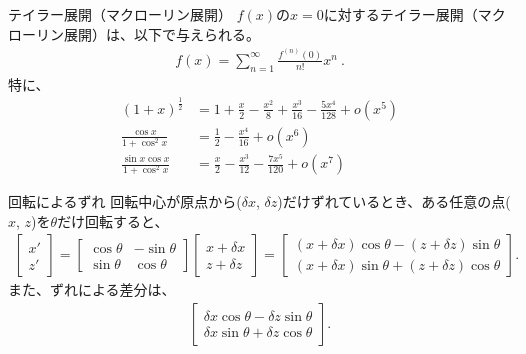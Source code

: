 


\begin{Formula}[label=formula:taylorexpansion]{テイラー展開（マクローリン展開）}
$f(x)$の$x = 0$に対するテイラー展開（マクローリン展開）は、以下で与えられる。
\begin{align*}
  f(x) = \sum_{n=1}^{\infty}\frac{f^{(n)}(0)}{n!}x^n\ .
\end{align*}
特に、
\begin{align*}
  (1+x)^\frac12 &= 1+\frac x2-\frac{x^2}8+\frac{x^3}{16}-\frac{5x^4}{128}+o\!\left(x^5\right)\\
  \frac{\cos x}{1+\cos^2x} &= \frac12-\frac{x^4}{16}+o\!\left(x^6\right)\\
  \frac{\sin x\cos x}{1+\cos^2x} &= \frac x2-\frac{x^3}{12}-\frac{7x^5}{120}+o\!\left(x^7\right)
\end{align*}
\end{Formula}



\begin{Formula}{回転によるずれ}
回転中心が原点から($\delta x$, $\delta z$)だけずれているとき、ある任意の点($x$, $z$)を$\theta$だけ回転すると、
\begin{align*}
  \left[
    \begin{array}{c}
      x'\\
      z'
    \end{array}
  \right]
  = \left[
    \begin{array}{cc}
      \cos\theta & -\sin\theta\\
      \sin\theta & \cos\theta
    \end{array}
  \right]\!\!
  \left[
    \begin{array}{c}
      x+\delta x\\
      z+\delta z
    \end{array}
  \right]
  = \left[
    \begin{array}{c}
      (x+\delta x)\cos\theta-(z+\delta z)\sin\theta\\
      (x+\delta x)\sin\theta+(z+\delta z)\cos\theta
    \end{array}
  \right].
\end{align*}
また、ずれによる差分は、
\begin{align*}
  \left[
    \begin{array}{c}
      \delta x\cos\theta-\delta z\sin\theta\\
      \delta x\sin\theta+\delta z\cos\theta
    \end{array}
  \right].
\end{align*}
\end{Formula}




